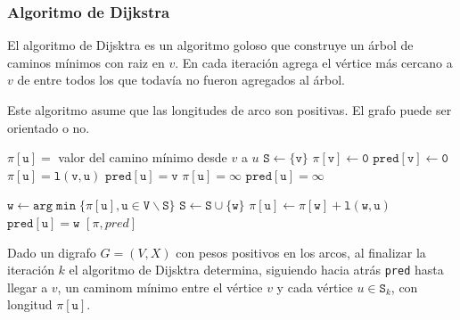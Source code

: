 \subsubsection{Algoritmo de Dijkstra}
El algoritmo de Dijsktra es un algoritmo goloso que construye un árbol de caminos mínimos con raiz en \(v\). En cada iteración agrega el vértice más cercano a \(v\) de entre todos los que todavía no fueron agregados al árbol.

Este algoritmo asume que las longitudes de arco son positivas. El grafo puede ser orientado o no.

\begin{algorithmic}
  \State $\mathtt{\pi[u] =}$ valor del camino mínimo desde $v$ a $u$
  \State $\mathtt{S \gets \{v\}}$
  \State $\mathtt{\pi[v] \gets 0}$
  \State $\mathtt{pred[v] \gets 0}$
  \State $\mathtt{\pi[u] = l(v, u)}$
  \State $\mathtt{pred[u] = v}$
  \Else
  \State $\mathtt{\pi[u] = \infty}$
  \State $\mathtt{pred[u] = \infty}$
  \EndIf
  \EndFor

  \State $\mathtt{w\gets arg\min\{\pi[u], u\in V\backslash S\}}$
  \State $\mathtt{S \gets S\cup\{w\}}$
  \State $\mathtt{\pi[u] \gets \pi[w] + l(w,u)}$
  \State $\mathtt{pred[u] = w}$
  \EndIf
  \EndFor
  \EndWhile
  \State\Return$[\mathtt{\pi}, pred]$
  \EndProcedure
\end{algorithmic}

\begin{lema}\label{lema::dijkstra::invariante}
  Dado un digrafo \(G=(V,X)\) con pesos positivos en los arcos, al finalizar la iteración \(k\) el algoritmo de Dijsktra determina, siguiendo hacia atrás \texttt{pred} hasta llegar a \(v\), un caminom mínimo entre el vértice \(v\) y cada vértice \(u \in \texttt{S}_k\), con longitud $\mathtt{\pi[u]}$.
\end{lema}

